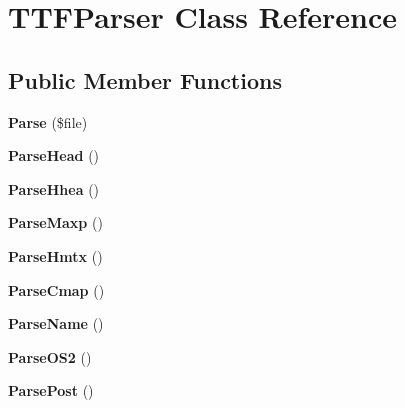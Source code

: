 \hypertarget{classTTFParser}{\section{T\+T\+F\+Parser Class Reference}
\label{classTTFParser}
}
\subsection*{Public Member Functions}
\begin{DoxyCompactItemize}
\item 
\hypertarget{classTTFParser_a00bf92696c4f3d48c5180821de2ce840}{{\bfseries Parse} (\$file)}\label{classTTFParser_a00bf92696c4f3d48c5180821de2ce840}

\item 
\hypertarget{classTTFParser_ae87aa2ef8fef27cff059106d57d1303c}{{\bfseries Parse\+Head} ()}\label{classTTFParser_ae87aa2ef8fef27cff059106d57d1303c}

\item 
\hypertarget{classTTFParser_a5068ab1775e58f2ddf8a5c2a74e11c43}{{\bfseries Parse\+Hhea} ()}\label{classTTFParser_a5068ab1775e58f2ddf8a5c2a74e11c43}

\item 
\hypertarget{classTTFParser_a45ca897180839588639c1c6a1fcaaf8b}{{\bfseries Parse\+Maxp} ()}\label{classTTFParser_a45ca897180839588639c1c6a1fcaaf8b}

\item 
\hypertarget{classTTFParser_adb82cd858d9cbab2cf350202662a8959}{{\bfseries Parse\+Hmtx} ()}\label{classTTFParser_adb82cd858d9cbab2cf350202662a8959}

\item 
\hypertarget{classTTFParser_af35ff7a233c6de7751e4df1ead414315}{{\bfseries Parse\+Cmap} ()}\label{classTTFParser_af35ff7a233c6de7751e4df1ead414315}

\item 
\hypertarget{classTTFParser_a1bf8839b790543a35722529d151cd0df}{{\bfseries Parse\+Name} ()}\label{classTTFParser_a1bf8839b790543a35722529d151cd0df}

\item 
\hypertarget{classTTFParser_aeeb7b994865c9690f4c5e7877c89e0a6}{{\bfseries Parse\+O\+S2} ()}\label{classTTFParser_aeeb7b994865c9690f4c5e7877c89e0a6}

\item 
\hypertarget{classTTFParser_aecfdf351bb047a3c72cbc9db0ae75e46}{{\bfseries Parse\+Post} ()}\label{classTTFParser_aecfdf351bb047a3c72cbc9db0ae75e46}


\end{DoxyCompactItemize}
